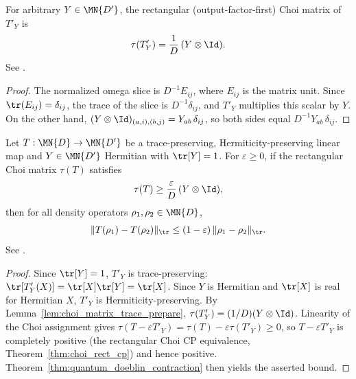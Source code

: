 \begin{lemma}
    \label{lem:choi_matrix_trace_prepare}
    \leanok
    For arbitrary $Y\in\MN{D'}$, the rectangular
    (output-factor-first) Choi matrix of $T'_Y$ is
    \begin{align}
        \tau(T'_Y) = \frac{1}{D}\,(Y\otimes\Id).
        \label{eq:choi_trace_prepare}
    \end{align}
    See \cite[Chapter~8, Eq.~(8.86)]{Wolf2012Quantum}.
\end{lemma}

\begin{proof}\leanok
    The normalized omega slice is $D^{-1}E_{ij}$, where $E_{ij}$ is the
    matrix unit.  Since $\tr(E_{ij})=\delta_{ij}$, the trace of the slice
    is $D^{-1}\delta_{ij}$, and $T'_Y$ multiplies this scalar by $Y$.
    On the other hand, $(Y\otimes\Id)_{(a,i),(b,j)} = Y_{ab}\,\delta_{ij}$,
    so both sides equal $D^{-1}Y_{ab}\,\delta_{ij}$.
\end{proof}

\begin{theorem}
    \label{thm:choi_dominated_doeblin}
    \leanok
    Let $T:\MN{D}\to\MN{D'}$ be a trace-preserving,
    Hermiticity-preserving linear map and $Y\in\MN{D'}$ Hermitian
    with $\tr[Y]=1$.  For $\varepsilon\geq0$, if
    the rectangular Choi matrix $\tau(T)$ satisfies
    \begin{align}
        \tau(T) \ge \frac{\varepsilon}{D}\,(Y\otimes\Id),
        \label{eq:choi_domination}
    \end{align}
    then for all density operators $\rho_1,\rho_2\in\MN{D}$,
    \begin{align}
        \lVert T(\rho_1)-T(\rho_2)\rVert_{\tr}
        \le (1-\varepsilon)\,\lVert\rho_1-\rho_2\rVert_{\tr}.
        \label{eq:choi_doeblin_contraction}
    \end{align}
    See \cite[Chapter~8, Eq.~(8.86)]{Wolf2012Quantum}.
\end{theorem}

\begin{proof}\leanok
    Since $\tr[Y]=1$, $T'_Y$ is trace-preserving:
    $\tr[T'_Y(X)]=\tr[X]\tr[Y]=\tr[X]$.  Since $Y$ is Hermitian and
    $\tr[X]$ is real for Hermitian $X$, $T'_Y$ is Hermiticity-preserving.
    By Lemma~\ref{lem:choi_matrix_trace_prepare},
    $\tau(T'_Y)=(1/D)(Y\otimes\Id)$. Linearity of the Choi assignment gives
    $\tau(T-\varepsilon T'_Y)=\tau(T)-\varepsilon\tau(T'_Y)
    \ge0$, so $T-\varepsilon T'_Y$ is completely positive
    (the rectangular Choi CP equivalence, Theorem~\ref{thm:choi_rect_cp})
    and hence positive. Theorem~\ref{thm:quantum_doeblin_contraction} then
    yields the asserted bound.
\end{proof}

